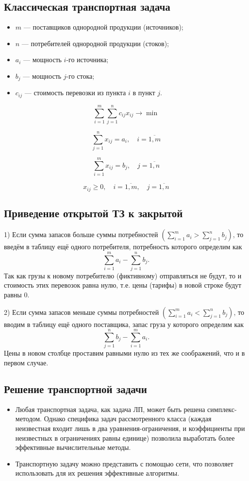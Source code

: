 \documentclass[17pt]{extarticle}
\begin{document}
\subsection{Классическая транспортная задача}
\begin{itemize}
    \item \( m \) — поставщиков однородной продукции (источников);
    \item \( n \) — потребителей однородной продукции (стоков);
    \item \( a_i \) — мощность \( i \)-го источника;
    \item \( b_j \) — мощность \( j \)-го стока;
    \item \( c_{ij} \) — стоимость перевозки из пункта \( i \) в пункт \( j \).
\end{itemize}

\[
    \sum_{i=1}^m \sum_{j=1}^n c_{ij} x_{ij} \rightarrow \min
\]

\[
    \sum_{j=1}^n x_{ij} = a_i, \quad i = \overline{1, m}
\]

\[
    \sum_{i=1}^m x_{ij} = b_j, \quad j = \overline{1, n}
\]

\[
    x_{ij} \geq 0, \quad i = \overline{1, m}, \quad j = \overline{1, n}
\]

\subsection{Приведение открытой ТЗ к закрытой}
1) Если сумма запасов больше суммы потребностей \( \left( \sum_{i=1}^m a_i > \sum_{j=1}^n b_j \right) \), то введём в таблицу ещё одного потребителя, потребность которого определим как
\[
    \sum_{i=1}^m a_i - \sum_{j=1}^n b_j.
\]
Так как грузы к новому потребителю (фиктивному) отправляться не будут, то и стоимость этих перевозок равна нулю, т.е. цены (тарифы) в новой строке будут равны 0.

2) Если сумма запасов меньше суммы потребностей \( \left( \sum_{i=1}^m a_i < \sum_{j=1}^n b_j \right) \), то вводим в таблицу ещё одного поставщика, запас груза у которого определим как
\[
    \sum_{j=1}^n b_j - \sum_{i=1}^m a_i.
\]
Цены в новом столбце проставим равными нулю из тех же соображений, что и в первом случае.

\subsection{Решение транспортной задачи}
\begin{itemize}
    \item Любая транспортная задача, как задача ЛП, может быть решена симплекс-методом. Однако специфика задач рассмотренного класса (каждая неизвестная входит лишь в два уравнения-ограничения, и коэффициенты при неизвестных в ограничениях равны единице) позволила выработать более эффективные вычислительные методы.
    \item Транспортную задачу можно представить с помощью сети, что позволяет использовать для их решения эффективные алгоритмы.
\end{itemize}
\end{document}
